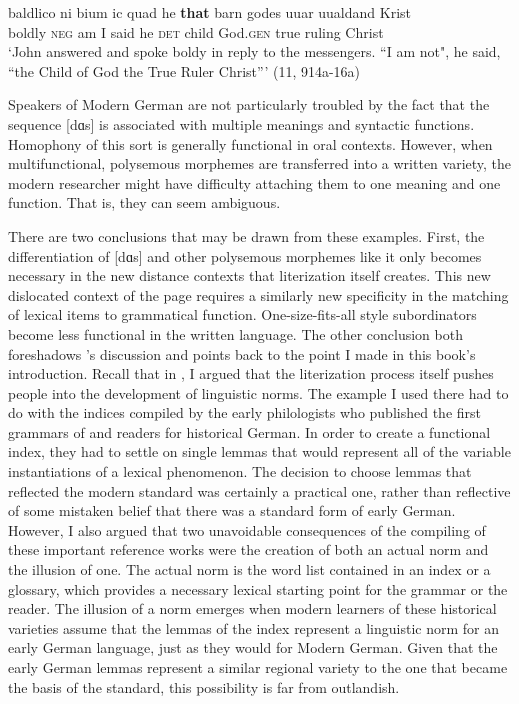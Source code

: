 \gll baldlico  ni   bium   ic   quad  he   \textbf{that}   barn   godes     uuar   uualdand Krist\\
boldly   \textsc{neg}   am    I  said   he  \textsc{det}   child  God.\textsc{gen}   true  ruling    Christ\\

\glt ‘John answered and spoke boldy in reply to the messengers. “I am not", he said, “the Child of God the True Ruler Christ”’ (11, 914a-16a)
\z
\z

\noindent Speakers of Modern German are not particularly troubled by the fact that the sequence [dɑs] is associated with multiple meanings and syntactic functions. Homophony of this sort is generally functional in oral contexts. However, when multifunctional, polysemous morphemes are transferred into a written variety, the modern researcher might have difficulty attaching them to one meaning and one function. That is, they can seem ambiguous.

There are two conclusions that may be drawn from these examples. First, the differentiation of [dɑs] and other polysemous morphemes like it only becomes necessary in the new distance contexts that literization itself creates. This new dislocated context of the page requires a similarly new specificity in the matching of lexical items to grammatical function. One-size-fits-all style subordinators become less functional in the written language. The other conclusion both foreshadows ’s discussion and points back to the point I made in this book’s introduction. Recall that in , I argued that the literization process itself pushes people into the development of linguistic norms. The example I used there had to do with the indices compiled by the early philologists who published the first grammars of and readers for historical German. In order to create a functional index, they had to settle on single lemmas that would represent all of the variable instantiations of a lexical phenomenon. The decision to choose lemmas that reflected the modern standard was certainly a practical one, rather than reflective of some mistaken belief that there was a standard form of early German. However, I also argued that two unavoidable consequences of the compiling of these important reference works were the creation of both an actual norm and the illusion of one. The actual norm is the word list contained in an index or a glossary, which provides a necessary lexical starting point for the grammar or the reader. The illusion of a norm emerges when modern learners of these historical varieties assume that the lemmas of the index represent a linguistic norm for an early German language, just as they would for Modern German. Given that the early German lemmas represent a similar regional variety to the one that became the basis of the standard, this possibility is far from outlandish.

